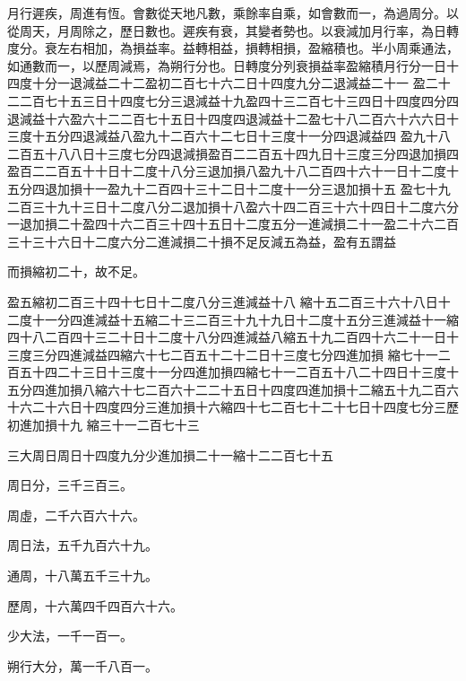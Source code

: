\begin{pinyinscope}
 月行遲疾，周進有恆。會數從天地凡數，乘餘率自乘，如會數而一，為過周分。以從周天，月周除之，歷日數也。遲疾有衰，其變者勢也。以衰減加月行率，為日轉度分。衰左右相加，為損益率。益轉相益，損轉相損，盈縮積也。半小周乘通法，如通數而一，以歷周減焉，為朔行分也。日轉度分列衰損益率盈縮積月行分一日十四度十分一退減益二十二盈初二百七十六二日十四度九分二退減益二十一
 盈二十二二百七十五三日十四度七分三退減益十九盈四十三二百七十三四日十四度四分四退減益十六盈六十二二百七十五日十四度四退減益十二盈七十八二百六十六六日十三度十五分四退減益八盈九十二百六十二七日十三度十一分四退減益四
 盈九十八二百五十八八日十三度七分四退減損盈百二二百五十四九日十三度三分四退加損四盈百二二百五十十日十二度十八分三退加損八盈九十八二百四十六十一日十二度十五分四退加損十一盈九十二百四十三十二日十二度十一分三退加損十五
 盈七十九二百三十九十三日十二度八分二退加損十八盈六十四二百三十六十四日十二度六分一退加損二十盈四十六二百三十四十五日十二度五分一進減損二十一盈二十六二百三十三十六日十二度六分二進減損二十損不足反減五為益，盈有五謂益



 而損縮初二十，故不足。



 盈五縮初二百三十四十七日十二度八分三進減益十八
 縮十五二百三十六十八日十二度十一分四進減益十五縮二十三二百三十九十九日十二度十五分三進減益十一縮四十八二百四十三二十日十二度十八分四進減益八縮五十九二百四十六二十一日十三度三分四進減益四縮六十七二百五十二十二日十三度七分四進加損
 縮七十一二百五十四二十三日十三度十一分四進加損四縮七十一二百五十八二十四日十三度十五分四進加損八縮六十七二百六十二二十五日十四度四進加損十二縮五十九二百六十六二十六日十四度四分三進加損十六縮四十七二百七十二十七日十四度七分三歷初進加損十九
 縮三十一二百七十三



 三大周日周日十四度九分少進加損二十一縮十二二百七十五



 周日分，三千三百三。



 周虛，二千六百六十六。



 周日法，五千九百六十九。



 通周，十八萬五千三十九。



 歷周，十六萬四千四百六十六。



 少大法，一千一百一。



 朔行大分，萬一千八百一。




\end{pinyinscope}
